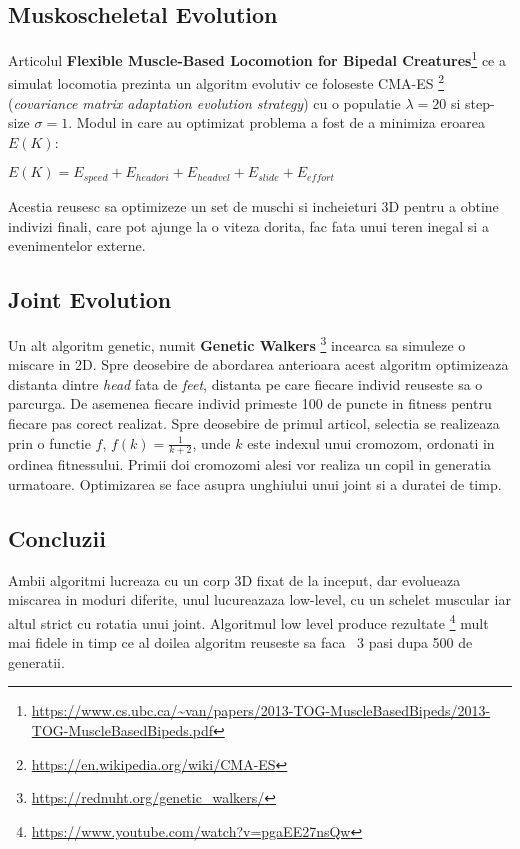\subsection{Muskoscheletal Evolution}
Articolul \textbf{Flexible Muscle-Based Locomotion for Bipedal Creatures}\footnote{\url{https://www.cs.ubc.ca/~van/papers/2013-TOG-MuscleBasedBipeds/2013-TOG-MuscleBasedBipeds.pdf}} ce a simulat locomotia prezinta un algoritm evolutiv ce foloseste CMA-ES \footnote{\url{https://en.wikipedia.org/wiki/CMA-ES}} (\textit{covariance matrix adaptation evolution strategy}) cu o populatie $\lambda = 20$ si step-size $\sigma = 1$. Modul in care au optimizat problema a fost de a minimiza eroarea $E(K)$:\begin{center} $E(K) = E_{speed} + E_{headori}+ E_{headvel}+ E_{slide}+ E_{effort}$ \end{center}

Acestia reusesc sa optimizeze un set de muschi si incheieturi 3D pentru a obtine indivizi finali, care pot ajunge la o viteza dorita, fac fata unui teren inegal si a evenimentelor externe.
\subsection{Joint Evolution}
Un alt algoritm genetic, numit \textbf{Genetic Walkers} \footnote{\url{https://rednuht.org/genetic_walkers/}} incearca sa simuleze o miscare in 2D. Spre deosebire de abordarea anterioara acest algoritm optimizeaza distanta dintre \textit{head} fata de \textit{feet}, distanta pe care fiecare individ reuseste sa o parcurga. De asemenea fiecare individ primeste 100 de puncte in fitness pentru fiecare pas corect realizat. Spre deosebire de primul articol, selectia se realizeaza prin o functie $f$, $f(k) = \frac{1}{k+2}$, unde $k$ este indexul unui cromozom, ordonati in ordinea fitnessului. Primii doi cromozomi alesi vor realiza un copil in generatia urmatoare. Optimizarea se face asupra unghiului unui joint si a duratei de timp.

\subsection{Concluzii}
Ambii algoritmi lucreaza cu un corp 3D fixat de la inceput, dar evolueaza miscarea in moduri diferite, unul lucureazaza low-level, cu un schelet muscular iar altul strict cu rotatia unui joint. Algoritmul low level produce rezultate \footnote{\url{https://www.youtube.com/watch?v=pgaEE27nsQw}} mult mai fidele in timp ce al doilea algoritm reuseste sa faca ~3 pasi dupa 500 de generatii.

